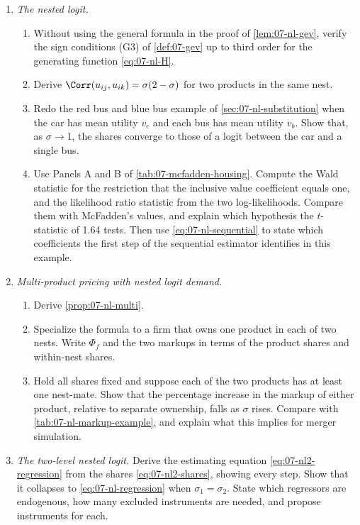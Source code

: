 \begin{enumerate}[label=\arabic*., leftmargin=*, itemsep=6pt]
\item \emph{The nested logit.}
\begin{enumerate}[label=(\alph*)]
  \item Without using the general formula in the proof of \cref{lem:07-nl-gev}, verify the sign conditions (G3)
  of \cref{def:07-gev} up to third order for the generating function \eqref{eq:07-nl-H}.
  \item Derive $\Corr(u_{ij}, u_{ik}) = \sigma(2 - \sigma)$ for two products in the same nest.
  \item Redo the red bus and blue bus example of \cref{sec:07-nl-substitution} when the car has mean utility $v_c$
  and each bus has mean utility $v_b$. Show that, as $\sigma \to 1$, the shares converge to those of a logit
  between the car and a single bus.
  \item Use Panels A and B of \cref{tab:07-mcfadden-housing}. Compute the Wald statistic for the restriction that
  the inclusive value coefficient equals one, and the likelihood ratio statistic from the two log-likelihoods.
  Compare them with McFadden's values, and explain which hypothesis the $t$-statistic of 1.64 tests. Then use
  \eqref{eq:07-nl-sequential} to state which coefficients the first step of the sequential estimator identifies in
  this example.
\end{enumerate}

\item \emph{Multi-product pricing with nested logit demand.}
\begin{enumerate}[label=(\alph*)]
  \item Derive \cref{prop:07-nl-multi}.
  \item Specialize the formula to a firm that owns one product in each of two nests. Write $\Phi_f$ and the two
  markups in terms of the product shares and within-nest shares.
  \item Hold all shares fixed and suppose each of the two products has at least one nest-mate. Show that the
  percentage increase in the markup of either product, relative to separate ownership, falls as $\sigma$ rises.
  Compare with \cref{tab:07-nl-markup-example}, and explain what this implies for merger simulation.
\end{enumerate}

\item \emph{The two-level nested logit.} Derive the estimating equation \eqref{eq:07-nl2-regression} from the
shares \eqref{eq:07-nl2-shares}, showing every step. Show that it collapses to \eqref{eq:07-nl-regression} when
$\sigma_1 = \sigma_2$. State which regressors are endogenous, how many excluded instruments are needed, and propose
instruments for each.


\end{enumerate}
